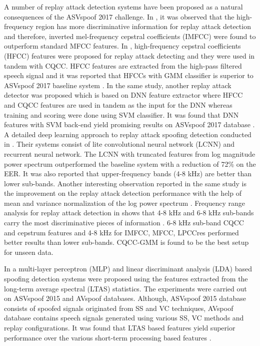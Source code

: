 \documentclass{article}
\begin{document}
A number of replay attack detection systems have been proposed as a natural consequences of the ASVspoof 2017
challenge.  In \cite{li2017study}, it was observed that the high-frequency region has more discriminative information
for replay attack detection and therefore, inverted mel-frequency cepstral coefficients (IMFCC) were found to
outperform standard MFCC features. In \cite{nagarsheth2017replay}, high-frequency cepstral coefficients (HFCC) features
were proposed for replay attack detecting and they were used in tandem with CQCC. HFCC features are extracted from the
high-pass filtered speech signal and it was reported that HFCCs with GMM classifier is superior to ASVspoof 2017
baseline system \cite{nagarsheth2017replay}. In the same study, another replay attack detector was proposed which is
based on DNN feature extractor where HFCC and CQCC features are used in tandem as the input for the DNN whereas
training and scoring were done using SVM classifier. It was found that DNN features with SVM back-end yield promising
results on ASVspoof 2017 database \cite{nagarsheth2017replay}. A detailed deep learning approach to replay attack
spoofing detection conducted in \cite{lavrentyeva2017audio}. Their systems consist of lite convolutional neural network
(LCNN) and recurrent neural network. The LCNN with truncated features from log magnitude power spectrum outperformed
the baseline system with a reduction of 72\% on the EER. It was also reported that upper-frequency bands (4-8 kHz) are
better than lower sub-bands. Another interesting observation reported in the same study is the improvement on the
replay attack detection performance with the help of mean and variance normalization of the log power spectrum
\cite{lavrentyeva2017audio}. Frequency range analysis for replay attack detection in \cite{witkowski2017audio} shows
that 4-8 kHz and 6-8 kHz sub-bands carry the most discriminative pieces of information \cite{witkowski2017audio}. 6-8
kHz sub-band CQCC and cepstrum features and 4-8 kHz for IMFCC, MFCC, LPCCres performed better results than lower
sub-bands. CQCC-GMM is found to be the best setup for unseen data.

In \cite{muckenhirn2016presentation,muckenhirn2017long} a multi-layer perceptron (MLP) and linear discriminant analysis
(LDA) based spoofing detection systems were proposed using the features extracted from the long-term average spectral
(LTAS) statistics. The experiments were carried out on ASVspoof 2015 and AVspoof \cite{ergunay2015vulnerability}
databases. Although, ASVspoof 2015 database consists of spoofed signals originated from SS and VC techniques, AVspoof
database contains speech signals generated using various SS, VC methods and replay configurations. It was found that
LTAS based features yield superior performance over the various short-term processing based features
\cite{muckenhirn2017long}.
\end{document}

